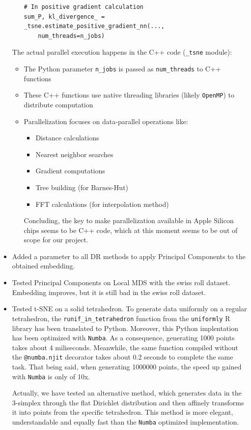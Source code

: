 \documentclass[a4paper,12pt]{article}
\begin{document}
\begin{itemize}
\begin{itemize}
\begin{verbatim}
# In positive gradient calculation
sum_P, kl_divergence_ = _tsne.estimate_positive_gradient_nn(...,
    num_threads=n_jobs)
        \end{verbatim}
    \end{itemize}
    The actual parallel execution happens in the C++ code (\texttt{\_tsne} module):
    \begin{itemize}
        \item The Python parameter \texttt{n\_jobs} is passed as \texttt{num\_threads} to C++ functions
        \item These C++ functions use native threading libraries (likely \texttt{OpenMP}) to distribute computation
        \item Parallelization focuses on data-parallel operations like:
        \begin{itemize}
            \item Distance calculations
            \item Nearest neighbor searches
            \item Gradient computations
            \item Tree building (for Barnes-Hut)
            \item FFT calculations (for interpolation method)
        \end{itemize}
    Concluding, the key to make parallelization available in Apple Silicon chips seems to be C++ code, which at this moment seems to be out of scope for our project.
    \end{itemize}
    \item Added a parameter to all DR methods to apply Principal Components to the obtained embedding.
    \item Tested Principal Components on Local MDS with the swiss roll dataset. Embedding improves, but it is still bad in the swiss roll dataset.
    \item Tested t-SNE on a solid tetrahedron. To generate data uniformly on a regular tetrahedron, the \texttt{runif\_in\_tetrahedron} function from the \texttt{uniformly} R library has been translated to Python. Moreover, this Python implentation has been optimized with \texttt{Numba}. As a consequence, generating 1000 points takes about 4 miliseconds. Meanwhile, the same function compiled without the \texttt{@numba.njit} decorator takes about 0.2 seconds to complete the same task. That being said, when generating 1000000 points, the speed up gained with \texttt{Numba} is only of 10x.
    
    Actually, we have tested an alternative method, which generates data in the 3-simplex through the flat Dirichlet distribution and then affinely transforms it into points from the specific tetrahedron. This method is more elegant, understandable and equally fast than the \texttt{Numba} optimized implementation.


\end{itemize}
\end{document}
